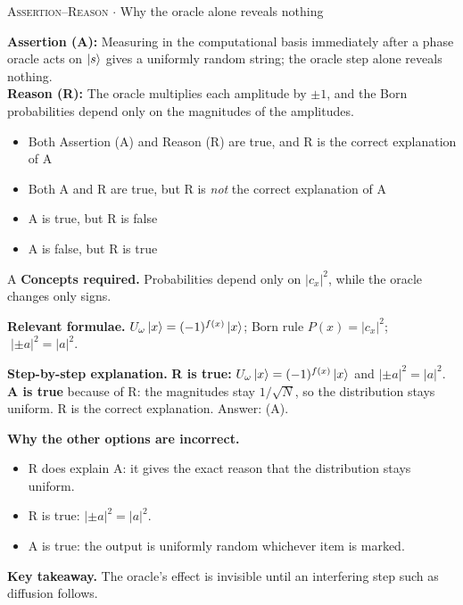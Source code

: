\documentclass[11pt,a4paper]{article}
\newcommand{\optlabel}[1]{\textbf{(#1)}}
\newcommand{\correctlabel}[1]{\textcolor{okgreen}{\textbf{(#1)}\,\ding{51}}}
\newenvironment{qitem}[1]{\begin{list}{}{\setlength{\leftmargin}{3.3em}\setlength{\labelwidth}{3.1em}%
  \setlength{\labelsep}{0.2em}\setlength{\topsep}{3pt}\setlength{\parsep}{3pt}}\item[\textbf{Q.#1}\hfill]}{\end{list}}
\newcommand{\qsep}{\par\vspace{2pt}{\color{black!15}\hrule}\vspace{4pt}}
\newcommand{\qmeta}[2]{{\footnotesize\color{black!60}\textsc{#1} \;$\cdot$\; #2}\par}
\begin{document}
\begin{qitem}{37}
\qmeta{Assertion--Reason}{Why the oracle alone reveals nothing}
\textbf{Assertion (A):} Measuring in the computational basis immediately after a phase oracle acts on $\ket{s}$ gives a uniformly random string; the oracle step alone reveals nothing.\\[1mm]
\textbf{Reason (R):} The oracle multiplies each amplitude by $\pm1$, and the Born probabilities depend only on the magnitudes of the amplitudes.
\begin{itemize}[leftmargin=2.6em, labelsep=0.4em, itemsep=2pt, topsep=3pt]
\item[\correctlabel{A}] Both Assertion (A) and Reason (R) are true, and R is the correct explanation of A
\item[\optlabel{B}] Both A and R are true, but R is \emph{not} the correct explanation of A
\item[\optlabel{C}] A is true, but R is false
\item[\optlabel{D}] A is false, but R is true
\end{itemize}
\end{qitem}
\begin{solbox}{A}
\textbf{\color{brand}Concepts required.} Probabilities depend only on $|c_x|^2$, while the oracle changes only signs.

\textbf{\color{brand}Relevant formulae.} $U_\omega\ket{x} = (-1)^{f(x)}\ket{x}$; Born rule $P(x) = |c_x|^2$; $\;|\pm a|^2 = |a|^2$.

\textbf{\color{brand}Step-by-step explanation.} \textbf{R is true:} $U_\omega\ket{x} = (-1)^{f(x)}\ket{x}$ and $|\pm a|^2 = |a|^2$. \textbf{A is true} because of R: the magnitudes stay $1/\sqrt N$, so the distribution stays uniform.
R is the correct explanation. Answer: (A).

\textbf{\color{brand}Why the other options are incorrect.}
\begin{itemize}[leftmargin=2.4em, itemsep=1pt, topsep=2pt]
\item[\textbf{(B)}] R does explain A: it gives the exact reason that the distribution stays uniform.
\item[\textbf{(C)}] R is true: $|\pm a|^2 = |a|^2$.
\item[\textbf{(D)}] A is true: the output is uniformly random whichever item is marked.
\end{itemize}
\textbf{\color{brand}Key takeaway.} The oracle's effect is invisible until an interfering step such as diffusion follows.
\end{solbox}
\qsep
\end{document}
